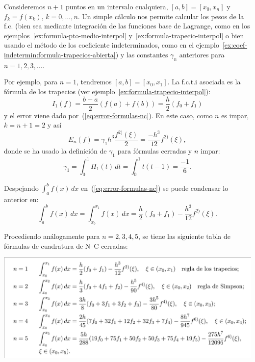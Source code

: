 \begin{example}
  \label{ex:fc-NC-abiertas}
  Consideremos $n+1$ puntos en un intervalo cualquiera,
  $[a,b]=[x_{0},x_{n}]$ y $f_k=f(x_k)$, $k=0,\dots,n$. Un simple
  cálculo nos permite calcular los pesos de la f.c. (bien sea mediante
  integración de las funciones base de Lagrange, como en los
  ejemplos~\ref{ex:formula-pto-medio-interpol}
  y~\ref{ex:formula-trapecio-interpol} o bien usando el método de los
  coeficiente indeterminados, como en el
  ejemplo~\ref{ex:coef-indetermin:formula-trapecios-abierta}) y las
  constantes $\gamma_n$ anteriores para $n=1,2,3,...$.

  Por ejemplo, para $n=1$, tendremos $[a,b]=[x_0,x_1]$. La f.c.t.i
  asociada es la fórmula de los trapecios (ver
  ejemplo~\ref{ex:formula-trapecio-interpol}):
  \begin{equation*}
    I_1(f) = \frac{b-a}{2}(f(a)+f(b))
    = \frac{h}{2}(f_0+f_1)
  \end{equation*}
  y el error viene dado por~(\ref{eq:error-formulas-nc}). En este
  caso, como $n$ es impar, $k=n+1=2$ y así
  \begin{equation*}
    E_n(f)=\gamma_1 h^{3}\frac{f^{2)}(\xi)}{2}=\frac{-h^3}{12} f^{2)}(\xi),
  \end{equation*}
  donde se ha usado la definición de $\gamma_1$ para fórmulas cerradas
  y $n$ impar:
  \begin{equation*}
    \gamma_1 = \int_0^1 \Pi_1(t)\,dt = \int_0^1 t(t-1) = \frac{-1}{6}.
  \end{equation*}

  Despejando $\int_a^b f(x)\,dx$ en~(\ref{eq:error-formulas-nc}) se
  puede condensar lo anterior en:
  \begin{equation*}
    \int_a^b f(x)\,dx = \int_{x_0}^{x_1} f(x)\,dx =
    \frac{h}{2}(f_0+f_1) - \frac{h^3}{12} f^{2)}(\xi).
  \end{equation*}

  Procediendo análogamente para $n=2,3,4,5$, se tiene las
  siguiente tabla de fórmulas de cuadratura de N--C cerradas:
  \begin{center}
    \includegraphics[width=0.95\linewidth]{tema3/formulas-nc-cerradas}
  \end{center}
\end{example}

